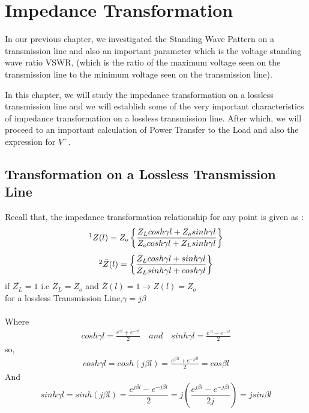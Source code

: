 \chapter{Impedance Transformation}\label{lec:lec6}
In our previous chapter, we investigated the Standing Wave Pattern on a transmission line and also an important parameter which is the voltage standing wave ratio VSWR, (which is the ratio of the maximum voltage seen on the transmission line to the minimum voltage seen on the transmission line).

In this chapter, we will study the impedance transformation on a lossless
transmission line and we will establish some of the very important characteristics of impedance transformation on a lossless transmission line. After which, we will proceed to an important calculation of Power Transfer to the Load and also the expression for $V^{+}$.
\section{Transformation on a Lossless Transmission Line}
Recall that, the impedance transformation relationship for any point is given as :
\begin{align*}
\footnotemark[1]Z(l) = Z_o\left\lbrace \frac{Z_Lcosh\gamma l + Z_osinh\gamma l}{Z_ocosh\gamma l + Z_Lsinh\gamma l}\right\rbrace 
\end{align*}
\begin{align*}
\footnotemark[2]\bar{Z}(l) = \left\lbrace \frac{\bar{Z}_Lcosh\gamma l + sinh\gamma l}{\bar{Z}_Lsinh\gamma l + cosh\gamma l}\right\rbrace 
\end{align*}
if $\bar{Z_L} = 1$ i.e $Z_L = Z_o$ and $\bar{Z}(l) = 1 \rightarrow  Z(l) = Z_o$\\
for a lossless Transmission Line,$\gamma=j\beta$\\\\
Where
\begin{align*}
cosh\gamma l = \frac{e^{\gamma l} + e^{-\gamma l}}{2} \quad and \quad sinh\gamma l = \frac{e^{\gamma l} - e^{-\gamma l}}{2}
\end{align*}
so,
\begin{align*}
cosh\gamma l= cosh(j\beta l)=\frac{e^{j \beta l} + e^{-j \beta l}}{2}=cos\beta l
\end{align*}
And
\begin{dmath*}
sinh\gamma l=sinh(j \beta l) = \frac{e^{j \beta l} - e^{-j \beta l}}{2}=j\left( \frac{e^{j \beta l} - e^{-j \beta l}}{2j}\right) =jsin\beta l
\end{dmath*}

